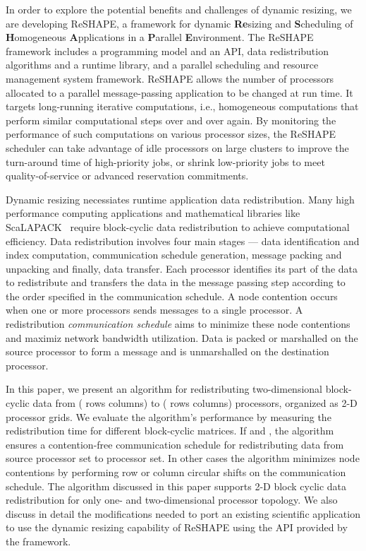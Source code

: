 \documentclass[letterpaper]{llncs}
\begin{document}
In order to explore the potential benefits and challenges of dynamic resizing, we are developing ReSHAPE, a framework for dynamic {\bf Re}sizing and {\bf S}cheduling of {\bf H}omo\-geneous {\bf A}pplications in a {\bf P}arallel {\bf E}nvironment. The ReSHAPE framework includes a programming model and an API, data redistribution algorithms and a runtime library, and a parallel scheduling and resource management system 
framework. 
ReSHAPE allows the number of processors allocated to a parallel message-passing application to be changed at run time.  
It targets long-running iterative computations, i.e., homogeneous computations that perform similar computational steps over and over again. 
By monitoring the performance of such computations on various processor sizes, 
the ReSHAPE scheduler can take advantage of idle processors on large 
clusters to improve the turn-around time of high-priority jobs, 
or shrink low-priority jobs to meet quality-of-service or advanced 
reservation commitments.

\vspace{-0.01in}
Dynamic resizing necessiates runtime application data redistribution.
Many high performance computing applications and mathematical libraries like ScaLAPACK~\cite{scalapack} require block-cyclic data redistribution to achieve 
computational efficiency. 
Data redistribution involves four main stages --- data identification and 
index computation, communication schedule generation, message packing and unpacking
 and finally, data transfer. 
Each processor identifies its part of the data to redistribute and transfers the 
data in the message passing step according to the order specified in the 
communication schedule. A node contention occurs when one or more processors
sends messages to a single processor. A redistribution \textit{communication schedule}
 aims to 
minimize these node contentions and maximiz network bandwidth utilization.
Data is packed or marshalled on the source processor to form a message and is unmarshalled on the destination processor.

\vspace{-0.01in}
In this paper, we present an algorithm for redistributing two-dimensional 
block-cyclic data from  (  rows  columns) to  
( rows  columns) processors, organized as 2-D processor grids. 
We evaluate the algorithm's 
performance by measuring the redistribution time for different block-cyclic matrices.
If  and , the algorithm  ensures a contention-free communication schedule for redistributing data from source processor set  to  processor set.
In other cases the algorithm minimizes node contentions by performing row or column circular shifts on the communication schedule. 
The algorithm discussed in this paper supports 2-D block cyclic data redistribution 
for only one- and two-dimensional processor topology.
We also discuss in detail the modifications needed to port an existing scientific application to use the dynamic resizing capability of ReSHAPE using the API provided by the framework.
\end{document}
